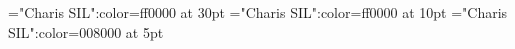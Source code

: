 \documentclass[a4paper]{article}
\begin{document}
\pagestyle{plain}
\sloppy
\setlength{\parfillskip}{0pt plus 1fil}
\font\ta="Charis SIL":color=ff0000 at 30pt
\font\tbta="Charis SIL":color=ff0000 at 10pt
\font\tctbta="Charis SIL":color=008000 at 5pt

\mbox{} 
\newpage 
\newpage 
\setcounter{page}{1} 
\pagestyle{fancy} 





\end{document}
